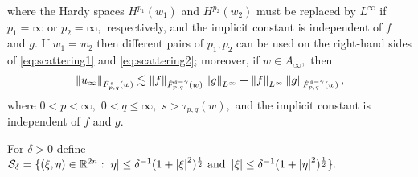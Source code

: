 \begin{theorem}
where the Hardy spaces $H^{p_1}(w_1)$ and $H^{p_2}(w_2)$ must be replaced by $L^\infty$ if $p_1=\infty$ or $p_2=\infty,$ respectively, and the implicit constant is independent of $f$ and $g.$ 
If $w_1=w_2$ then different pairs of $p_1, p_2$ can be used on the right-hand sides of \eqref{eq:scattering1} and \eqref{eq:scattering2}; moreover, if $w\in A_\infty,$ then 
\begin{equation*}
\norm{u_\infty}{\tlw{p}{s}{q}{w}} \lesssim \norm{f}{\tlw{p}{s-\gamma}{q}{w} } \norm{g}{L^\infty} +  \norm{f}{L^\infty}   \norm{g}{\tlw{p}{s-\gamma}{q}{w}},
\end{equation*}
where $0<p<\infty,$ $0<q\le\infty,$  $s>\tau_{p,q}(w),$ and the implicit constant is independent of $f$ and $g.$ 
\end{theorem} 


For $\delta >0$ define
$ \tilde{\Ss}_{\delta}=\{(\xi,\eta)\in \re^{2n}: \abs{\eta}\le \delta^{-1}(1+\abs{\xi}^2)^\frac{1}{2} \text{ and }\abs{\xi}\le \delta^{-1}(1+\abs{\eta}^2)^\frac{1}{2}\}.$



